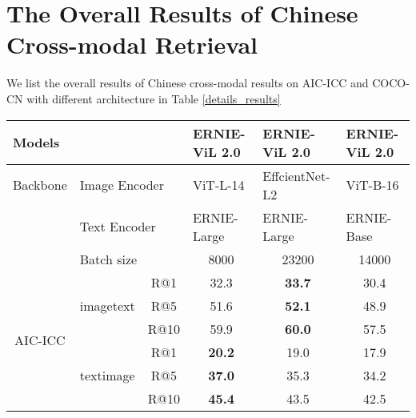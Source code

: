 \documentclass{article}
\begin{document}
\section{The Overall Results of Chinese Cross-modal Retrieval }
\label{overall_results}
We list the overall results of Chinese cross-modal results on AIC-ICC and COCO-CN with different architecture in Table \ref{details_results}
\begin{table}[]

\centering

\begin{tabular}{@{}cccccc@{}}
\toprule
\multicolumn{1}{l}{Models} & \multicolumn{2}{l}{} & \multicolumn{1}{l}{ERNIE-ViL 2.0} & \multicolumn{1}{l}{ERNIE-ViL 2.0} & \multicolumn{1}{l}{ERNIE-ViL 2.0} \\ \midrule
\multicolumn{1}{l|}{Backbone} & \multicolumn{2}{l|}{Image Encoder} & \multicolumn{1}{l|}{ViT-L-14} & \multicolumn{1}{l|}{EffcientNet-L2} & \multicolumn{1}{l}{ViT-B-16} \\ \cmidrule(l){2-6} 
\multicolumn{1}{l|}{} & \multicolumn{2}{l|}{Text    Encoder} & \multicolumn{1}{l|}{ERNIE-Large} & \multicolumn{1}{l|}{ERNIE-Large} & \multicolumn{1}{l}{ERNIE-Base}  \\ \midrule
\multicolumn{1}{l|}{} & \multicolumn{2}{l|}{Batch size} & \multicolumn{1}{c|}{8000} & \multicolumn{1}{c|}{23200} & \multicolumn{1}{c}{14000}  \\ \midrule
\multicolumn{1}{c|}{\multirow{7}{*}{AIC-ICC}} & \multirow{3}{*}{imagetext} & \multicolumn{1}{c|}{R@1} & \multicolumn{1}{c|}{32.3} & \multicolumn{1}{c|}{\textbf{33.7}} & \multicolumn{1}{c}{30.4}  \\
\multicolumn{1}{c|}{} &  & \multicolumn{1}{c|}{R@5} & \multicolumn{1}{c|}{51.6} & \multicolumn{1}{c|}{\textbf{52.1}} & \multicolumn{1}{c}{48.9}  \\
\multicolumn{1}{c|}{} &  & \multicolumn{1}{c|}{R@10} & \multicolumn{1}{c|}{59.9} & \multicolumn{1}{c|}{\textbf{60.0}} & \multicolumn{1}{c}{57.5}  \\ \cmidrule(l){2-6} 
\multicolumn{1}{c|}{} & \multirow{3}{*}{textimage} & \multicolumn{1}{c|}{R@1} & \multicolumn{1}{c|}{\textbf{20.2}} & \multicolumn{1}{c|}{19.0} & \multicolumn{1}{c}{17.9}  \\
\multicolumn{1}{c|}{} &  & \multicolumn{1}{c|}{R@5} & \multicolumn{1}{c|}{\textbf{37.0}} & \multicolumn{1}{c|}{35.3} & \multicolumn{1}{c}{34.2}  \\
\multicolumn{1}{c|}{} &  & \multicolumn{1}{c|}{R@10} & \multicolumn{1}{c|}{\textbf{45.4}} & \multicolumn{1}{c|}{43.5} & \multicolumn{1}{c}{42.5}   \\ \midrule

\end{tabular}
\end{table}
\end{document}
